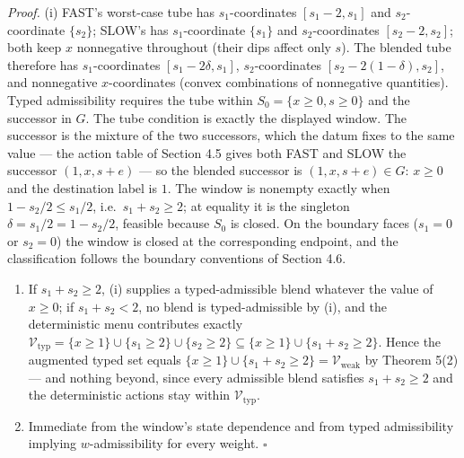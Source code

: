 \documentclass[11pt]{article}
\begin{document}
\emph{Proof.} (i) FAST's worst-case tube has \(s_1\)-coordinates
\([s_1 - 2, s_1]\) and \(s_2\)-coordinate \(\{s_2\}\); SLOW's has
\(s_1\)-coordinate \(\{s_1\}\) and \(s_2\)-coordinates
\([s_2 - 2, s_2]\); both keep \(x\) nonnegative throughout (their dips
affect only \(s\)). The blended tube therefore has \(s_1\)-coordinates
\([s_1 - 2\delta, s_1]\), \(s_2\)-coordinates
\([s_2 - 2(1-\delta), s_2]\), and nonnegative \(x\)-coordinates (convex
combinations of nonnegative quantities). Typed admissibility requires
the tube within \(S_0 = \{x \ge 0, s \ge 0\}\) and the successor in
\(G\). The tube condition is exactly the displayed window. The successor
is the mixture of the two successors, which the datum fixes to the same
value --- the action table of Section 4.5 gives both FAST and SLOW the
successor \((1, x, s + e)\) --- so the blended successor is
\((1, x, s + e) \in G\): \(x \ge 0\) and the destination label is \(1\).
The window is nonempty exactly when \(1 - s_2/2 \le s_1/2\),
i.e.~\(s_1 + s_2 \ge 2\); at equality it is the singleton
\(\delta = s_1/2 = 1 - s_2/2\), feasible because \(S_0\) is closed. On
the boundary faces (\(s_1 = 0\) or \(s_2 = 0\)) the window is closed at
the corresponding endpoint, and the classification follows the boundary
conventions of Section 4.6.

\begin{enumerate}
\def\labelenumi{(\roman{enumi})}
\setcounter{enumi}{1}
\item
  If \(s_1 + s_2 \ge 2\), (i) supplies a typed-admissible blend whatever
  the value of \(x \ge 0\); if \(s_1 + s_2 < 2\), no blend is
  typed-admissible by (i), and the deterministic menu contributes
  exactly
  \(\mathcal{V}_{\mathrm{typ}} = \{x \ge 1\} \cup \{s_1 \ge 2\} \cup \{s_2 \ge 2\} \subseteq \{x \ge 1\} \cup \{s_1 + s_2 \ge 2\}\).
  Hence the augmented typed set equals
  \(\{x \ge 1\} \cup \{s_1 + s_2 \ge 2\} = \mathcal{V}_{\mathrm{weak}}\)
  by Theorem 5(2) --- and nothing beyond, since every admissible blend
  satisfies \(s_1 + s_2 \ge 2\) and the deterministic actions stay
  within \(\mathcal{V}_{\mathrm{typ}}\).
\item
  Immediate from the window's state dependence and from typed
  admissibility implying \(w\)-admissibility for every weight. \ensuremath{\square}
\end{enumerate}
\end{document}
